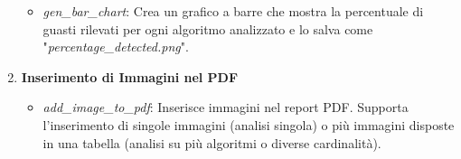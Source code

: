 \begin{enumerate}[label=\Alph*.]
\begin{itemize}
        \item \textit{gen\_bar\_chart}: Crea un grafico a barre che mostra la percentuale di guasti rilevati per ogni algoritmo analizzato e lo salva come "\textit{percentage\_detected.png}".
    \end{itemize}
    \item \textbf{Inserimento di Immagini nel PDF}
    \begin{itemize}
        \item \textit{add\_image\_to\_pdf}: Inserisce immagini nel report PDF. Supporta l'inserimento di singole immagini (analisi singola) o più immagini disposte in una tabella (analisi su più algoritmi o diverse cardinalità).
    \end{itemize}   
\end{enumerate}


    
    
    
